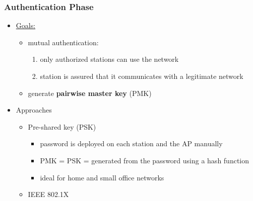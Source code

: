 \documentclass[final]{article}
\begin{document}
\subsubsection*{Authentication Phase}
\begin{itemize}[nosep]
    \item \underline{Goals:}
          \begin{itemize}[nosep]
              \item mutual authentication:
                    \begin{enumerate}[nosep, label=\arabic*)]
                        \item only authorized stations can use the network
                        \item station is assured that it communicates with a legitimate network
                    \end{enumerate}
              \item generate \textbf{pairwise master key} (PMK)
          \end{itemize}
    \item Approaches
          \begin{itemize}[nosep]
              \item Pre-shared key (PSK)
                    \begin{itemize}[nosep]
                        \item password is deployed on each station and the AP manually
                        \item PMK = PSK = generated from the password using a hash function
                        \item ideal for home and small office networks
                    \end{itemize}
              \item IEEE 802.1X
          \end{itemize}
\end{itemize}
\end{document}
